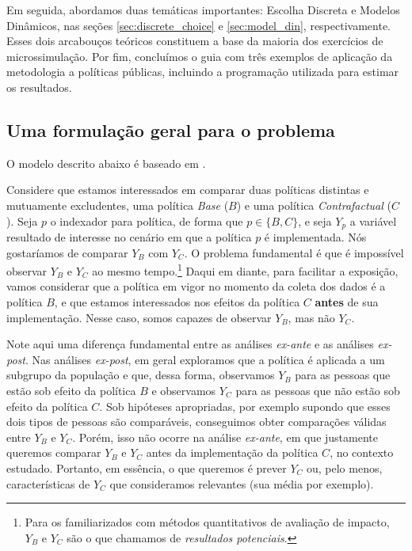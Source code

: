\documentclass[12pt]{article}
\theoremstyle{break}
\begin{document}
Em seguida, abordamos duas temáticas importantes: Escolha Discreta e Modelos Dinâmicos, nas seções \ref{sec:discrete_choice} e \ref{sec:model_din}, respectivamente. Esses dois arcabouços teóricos constituem a base da maioria dos exercícios de microssimulação. Por fim, concluímos o guia com três exemplos de aplicação da metodologia a políticas públicas, incluindo a programação utilizada para estimar os resultados. 


\subsection{Uma formulação geral para o problema}
\label{sec:contrafactual_geral}

O modelo descrito abaixo é baseado em \textcite{figari2015}.

Considere que estamos interessados em comparar duas políticas distintas e mutuamente excludentes, uma política \textit{Base} ($B$) e uma política \textit{Contrafactual} ($C$). Seja $p$ o indexador para política, de forma que $p\in\{B, C\}$, e seja $Y_p$ a variável resultado de interesse no cenário em que a política $p$ é implementada. Nós gostaríamos de comparar $Y_B$ com $Y_C$. O problema fundamental é que é impossível observar $Y_B$ e $Y_C$ ao mesmo tempo.\footnote{Para os familiarizados com métodos quantitativos de avaliação de impacto, $Y_B$ e $Y_C$ são o que chamamos de \textit{resultados potenciais}.} Daqui em diante, para facilitar a exposição, vamos considerar que a política em vigor no momento da coleta dos dados é a política $B$, e que estamos interessados nos efeitos da política $C$ \textbf{antes} de sua implementação. Nesse caso, somos capazes de observar $Y_B$, mas não $Y_C$. 

Note aqui uma diferença fundamental entre as análises \textit{ex-ante} e as análises \textit{ex-post}. Nas análises \textit{ex-post}, em geral exploramos que a política é aplicada a um subgrupo da população e que, dessa forma, observamos $Y_B$ para as pessoas que estão sob efeito da política $B$ e observamos $Y_C$ para as pessoas que não estão sob efeito da política $C$. Sob hipóteses apropriadas, por exemplo supondo que esses dois tipos de pessoas são comparáveis, conseguimos obter comparações válidas entre $Y_B$ e $Y_C$. Porém, isso não ocorre na análise \textit{ex-ante}, em que justamente queremos comparar $Y_B$ e $Y_C$ antes da implementação da política $C$,  no contexto estudado. Portanto, em essência, o que queremos é prever $Y_C$ ou, pelo menos, características de $Y_C$ que consideramos relevantes (sua média por exemplo). 
\end{document}
